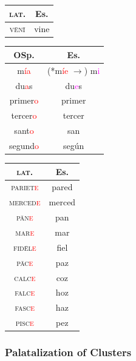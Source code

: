 \documentclass{report}[12pt]
\begin{document}
\begin{tcolorbox}

\end{tcolorbox}

\begin{tabular}{c c}
  \textsc{lat.} & Es. \\
  \hline
  \textsc{v\={e}n\={i}} & vine \\  
\end{tabular}

\begin{tabular}{c c}
  OSp. & Es. \\
  \hline
  m\textcolor{red}{ía} & (*m\textcolor{red}{íe} $\rightarrow$) m\textcolor{magenta}{i} \\
  du\textcolor{red}{a}s & du\textcolor{magenta}{e}s \\
  primer\textcolor{red}{o} & primer \\
  tercer\textcolor{red}{o} & tercer \\
  sant\textcolor{red}{o} & san \\
  segund\textcolor{red}{o} & según \\
\end{tabular}

\begin{tabular}{c c}
  \textsc{lat.} & Es. \\
  \hline
  \textsc{pariet\textcolor{red}{e}} & pared \\
  \textsc{merced\textcolor{red}{e}} & merced \\
  \textsc{p\={a}n\textcolor{red}{e}} & pan \\
  \textsc{mar\textcolor{red}{e}} & mar \\
  \textsc{fid\={e}l\textcolor{red}{e}} & fiel \\
  \textsc{p\={a}c\textcolor{red}{e}} & paz \\
  \textsc{calc\textcolor{red}{e}} & coz \\
  \textsc{falc\textcolor{red}{e}} & hoz \\
  \textsc{fasc\textcolor{red}{e}} & haz \\
  \textsc{pisc\textcolor{red}{e}} & pez \\
\end{tabular}

\subsubsection{Palatalization of Clusters}

\begin{tcolorbox}

\end{tcolorbox}
\end{document}
